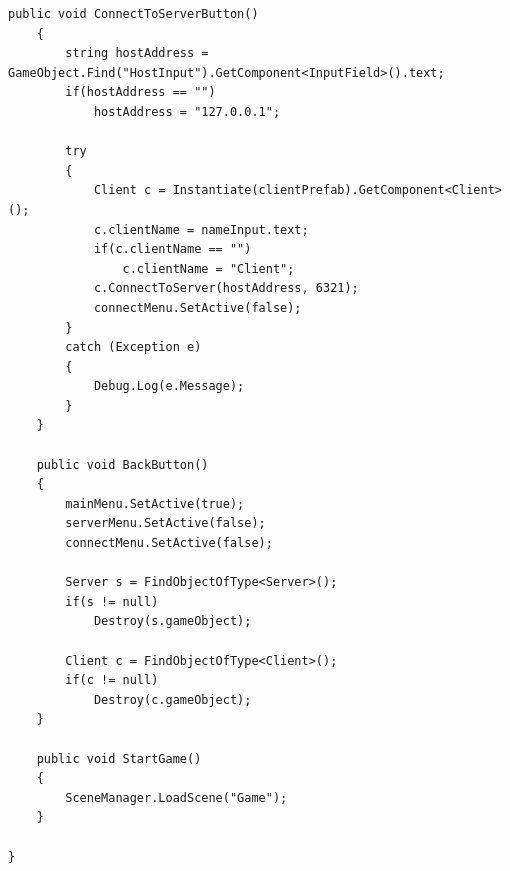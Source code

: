 \documentclass[12pt]{article}
\begin{document}
\begin{lstlisting}[language={[Sharp]C}, caption={GameManager.cs}, label={GameManagerScript}]
	public void ConnectToServerButton()
	{
		string hostAddress = GameObject.Find("HostInput").GetComponent<InputField>().text;
		if(hostAddress == "")
			hostAddress = "127.0.0.1";
		
		try
		{
			Client c = Instantiate(clientPrefab).GetComponent<Client>();
			c.clientName = nameInput.text;
			if(c.clientName == "")
				c.clientName = "Client";
			c.ConnectToServer(hostAddress, 6321);
			connectMenu.SetActive(false);
		}
		catch (Exception e)
		{
			Debug.Log(e.Message);
		}
	}
	
	public void BackButton()
	{
		mainMenu.SetActive(true);
		serverMenu.SetActive(false);
		connectMenu.SetActive(false);
		
		Server s = FindObjectOfType<Server>();
		if(s != null)
			Destroy(s.gameObject);
		
		Client c = FindObjectOfType<Client>();
		if(c != null)
			Destroy(c.gameObject);
	}
	
	public void StartGame()
	{
		SceneManager.LoadScene("Game");
	}
	
}
\end{lstlisting}
\end{document}
